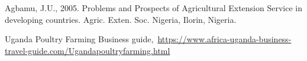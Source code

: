 \cleardoublepage
{}
{}
\begin{thebibliography}{99}

Agbamu, J.U., 2005. Problems and Prospects of Agricultural Extension Service in developing
countries. Agric. Exten. Soc. Nigeria, Ilorin, Nigeria.

Uganda Poultry Farming Business guide,\ \url{https://www.africa-uganda-business-travel-guide.com/Ugandapoultryfarming.html}

\end{thebibliography}
